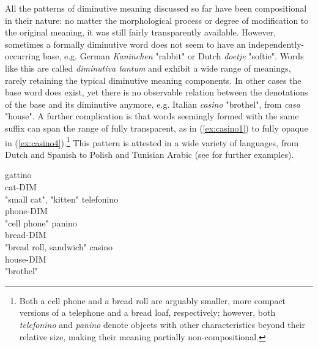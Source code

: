 All the patterns of diminutive meaning discussed so far have been compositional in their nature: no matter the morphological process or degree of modification to the original meaning, it was still fairly transparently available. However, sometimes a formally diminutive word does not seem to have an independently-occurring base, e.g. German \textit{Kaninchen} "rabbit" or Dutch \textit{doetje} "softie". Words like this are called \textit{diminutiva tantum} and exhibit a wide range of meanings, rarely retaining the typical diminutive meaning components. In other cases the base word does exist, yet there is no observable relation between the denotations of the base and its diminutive anymore, e.g. Italian \textit{casino} "brothel", from \textit{casa} "house". A further complication is that words seemingly formed with the same suffix can span the range of fully transparent, as in (\ref{ex:casino1}) to fully opaque in (\ref{ex:casino4}).\footnote{Both a cell phone and a bread roll are arguably smaller, more compact versions of a telephone and a bread loaf, respectively; however, both \textit{telefonino} and \textit{panino} denote objects with other characteristics beyond their relative size, making their meaning partially non-compositional.} This pattern is attested in a wide variety of languages, from Dutch and Spanish to Polish and Tunisian Arabic (see \citeauthor{DeBelder+etal+2014} \citeyear{DeBelder+etal+2014} for further examples).
\begin{exe}
\ex \label{ex:casino} 
\begin{multicols}{2}
\begin{xlist}
\ex \label{ex:casino1} \gll
gattino \\
cat-DIM \\
\trans "small cat", "kitten"
\ex \label{ex:casino2} \gll
telefonino \\
phone-DIM \\
\trans "cell phone"
\columnbreak
\ex \label{ex:casino3} \gll
panino \\
bread-DIM \\
\trans "bread roll, sandwich"
\ex \label{ex:casino4} \gll
casino \\
house-DIM \\
\trans "brothel"
\end{xlist}
\end{multicols}
\end{exe}

